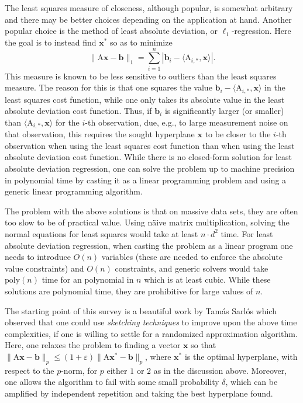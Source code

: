 \documentclass[11pt]{article}
\newcommand{\mat}[1]{{\ensuremath{\bm{\mathrm{#1}}}}}
\def\b{{\mathbf b}}
\def\matA{\mat{A}}
\def\x{{\mathbf x}}
\def\b{{\mathbf b}}
\newcommand{\eps}{\varepsilon}
\newcommand{\poly}{{\mathrm{poly}}}
\begin{document}
The least squares measure of closeness, although popular, is somewhat arbitrary and 
there may be better choices depending on the application at hand. Another popular
choice is the method of least absolute deviation, or $\ell_1$-regression. Here
the goal is to instead find $\x^*$ so as to minimize 
$$\|\matA \x- \b\|_1 = \sum_{i=1}^n |\b_i - \langle \matA_{i,*}, \x \rangle |.$$ 
This measure is known 
to be less sensitive to outliers
than the least squares measure. The reason for this is that one squares
the value $\b_i - \langle \matA_{i,*}, \x \rangle$ in the least squares cost function, while one
only takes its absolute value in the least absolute deviation cost function. Thus,
if $\b_i$ is significantly larger (or smaller) than $\langle \matA_{i,*}, \x \rangle$ for the 
$i$-th observation, due, e.g., to large measurement noise on that observation, this
requires the sought hyperplane $\x$ to be closer to the $i$-th observation 
when using the least squares cost function than when using the least absolute deviation
cost function. While there is no closed-form solution for least absolute deviation
regression, one can solve the problem up to machine precision in polynomial time
by casting it as a linear programming problem and using a generic linear programming
algorithm.

The problem with the above solutions is that on massive data sets, they are
often too slow to be of practical value. Using n\"aive matrix multiplication,
solving the normal equations for least squares would take at least $n \cdot d^2$
time. For least absolute deviation regression, when casting the problem as a linear
program one needs to introduce $O(n)$ variables (these are needed to enforce the absolute
value constraints) and $O(n)$ constraints, and generic solvers would take 
$\poly(n)$ time for an polynomial in $n$ which is at least cubic. 
While these solutions are polynomial time, they are prohibitive for 
large values of $n$. 

The starting point of this survey is a beautiful work by Tam\'{a}s Sarl\'os \cite{S06} which
observed that one could use {\it sketching techniques} to improve upon the
above time complexities, if one is willing to settle for a randomized approximation
algorithm. Here, one relaxes the problem to finding a vector $\x$ so that
$\|\matA \x- \b\|_p \leq (1+\eps)\|\matA \x^*- \b\|_p$, where $\x^*$ is the optimal hyperplane, 
with respect to the $p$-norm, for $p$ either $1$ or $2$ as in the discussion above.
Moreover, one allows the algorithm to fail with some small probability $\delta$, 
which can be amplified by independent repetition and taking the best hyperplane found.
\end{document}
